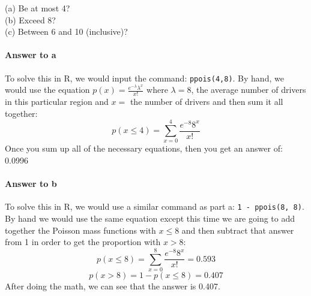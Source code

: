 \documentclass{article}
\newcommand{\code}[1]{\texttt{#1}}
\begin{document}
	(a) Be at most 4? \\
	(b) Exceed 8? \\
	(c) Between 6 and 10 (inclusive)?

	\paragraph{Answer to a} To solve this in R, we would input the command: \code{ppois(4,8)}. By 
	hand, we would use the equation $p(x) = \frac{e^{-\lambda}\lambda^x}{x!}$ where $\lambda = 
	8$, the average number of drivers in this particular region and $x=$ the number of drivers and 
	then sum it all together:
	\begin{displaymath}
		p(x \le 4) = \sum_{x=0}^{4} \frac{e^{-8}8^x}{x!}
	\end{displaymath}
	Once you sum up all of the necessary equations, then you get an answer of: 0.0996 

\iffalse
	\begin{displaymath}
		p(4) = \frac{e^{-8}8^4}{4!} = 0.0573 %
	\end{displaymath}
	\begin{displaymath}
		p(3) = \frac{e^{-8}8^3}{3!} = 0.0286 %
	\end{displaymath}
	\begin{displaymath}
		p(2) = \frac{e^{-8}8^2}{2!} = 0.0107 %
	\end{displaymath}
	\begin{displaymath}
		p(1) = \frac{e^{-8}8^1}{1!} = 0.00268 %
	\end{displaymath}
	\begin{displaymath}
		p(0) = \frac{e^{-8}8^0}{0!} = 0.000335 %
	\end{displaymath}
	To get the actual answer, we need to sum together all of these.
	\begin{displaymath}
		p(4 \le x) = \sum_{x=0}^{4} \frac{e^{-8}8^x}{x!} = 0.0996 %
	\end{displaymath}
\fi
	
	\paragraph{Answer to b} To solve this in R, we would use a similar command as part a: \code{1 
	- ppois(8, 8)}. By hand we would use the same equation except this time we are going to add 
	together the Poisson mass functions with $x \le 8$ and then subtract that answer from 1 in 
	order to get the proportion with $x > 8$: 
	\begin{displaymath}
		p(x \le 8) = \sum_{x=0}^{8} \frac{e^{-8}8^x}{x!} = 0.593 %
	\end{displaymath}
	\begin{displaymath}
		p(x > 8) = 1 - p(x \le 8) = 0.407 %
	\end{displaymath}
	After doing the math, we can see that the answer is 0.407.
\end{document}
